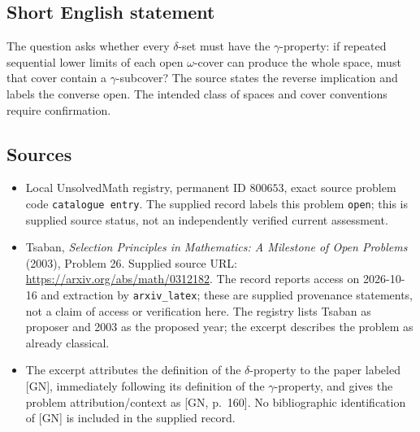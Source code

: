 \documentclass[11pt]{article}
\begin{document}
\subsection{Short English statement}
The question asks whether every \(\delta\)-set must have the \(\gamma\)-property: if repeated sequential lower limits of each open \(\omega\)-cover can produce the whole space, must that cover contain a \(\gamma\)-subcover? The source states the reverse implication and labels the converse open. The intended class of spaces and cover conventions require confirmation.
\subsection{Sources}
\begin{itemize}
\item Local UnsolvedMath registry, permanent ID \(800653\), exact source problem code \texttt{catalogue entry}. The supplied record labels this problem \texttt{open}; this is supplied source status, not an independently verified current assessment.
\item Tsaban, \emph{Selection Principles in Mathematics: A Milestone of Open Problems} (2003), Problem 26. Supplied source URL: \url{https://arxiv.org/abs/math/0312182}. The record reports access on 2026-10-16 and extraction by \texttt{arxiv\_latex}; these are supplied provenance statements, not a claim of access or verification here. The registry lists Tsaban as proposer and 2003 as the proposed year; the excerpt describes the problem as already classical.
\item The excerpt attributes the definition of the \(\delta\)-property to the paper labeled [GN], immediately following its definition of the \(\gamma\)-property, and gives the problem attribution/context as [GN, p.\ 160]. No bibliographic identification of [GN] is included in the supplied record.
\end{itemize}
\end{document}
